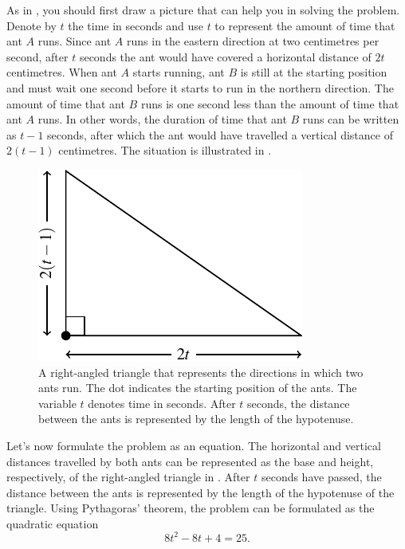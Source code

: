 \documentclass[a4paper,oneside,12pt]{article}
\begin{document}
\begin{solution}
As in , you should first draw a
picture that can help you in solving the problem.  Denote by $t$ the
time in seconds and use $t$ to represent the amount of time that ant
$A$ runs.  Since ant $A$ runs in the eastern direction at two
centimetres per second, after $t$ seconds the ant would have covered a
horizontal distance of $2t$ centimetres.  When ant $A$ starts running,
ant $B$ is still at the starting position and must wait one second
before it starts to run in the northern direction.  The amount of time
that ant $B$ runs is one second less than the amount of time that ant
$A$ runs.  In other words, the duration of time that ant $B$ runs can
be written as $t - 1$ seconds, after which the ant would have
travelled a vertical distance of $2(t - 1)$ centimetres.  The
situation is illustrated in .

\begin{figure}[!htbp]
\centering
\includegraphics[scale=1]{image/09/running-ants.pdf}
\caption{%
  A right-angled triangle that represents the directions in which two
  ants run.  The dot indicates the starting position of the ants.  The
  variable $t$ denotes time in seconds.  After $t$ seconds, the
  distance between the ants is represented by the length of the
  hypotenuse.
}
\label{fig:running_ants_triangle}
\end{figure}

Let's now formulate the problem as an equation.  The horizontal and
vertical distances travelled by both ants can be represented as the
base and height, respectively, of the right-angled triangle in
.  After $t$ seconds have passed,
the distance between the ants is represented by the length of the
hypotenuse of the triangle.  Using Pythagoras' theorem, the problem
can be formulated as the quadratic equation
\begin{equation}
\label{eqn:running_ants_quadratic_equation}
8t^2 - 8t + 4
=
25.
\end{equation}


\end{solution}
\end{document}
